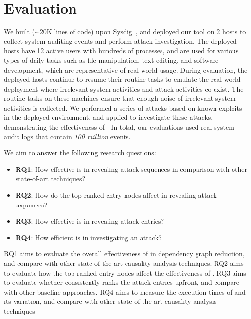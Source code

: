 \section{Evaluation}


We built \tool ($\sim$20K lines of code) upon Sysdig~\cite{sysdig}, and deployed our tool on 2 hosts to collect system auditing events and perform attack investigation. 
The deployed hosts have 12 active users with hundreds of processes, and are used for various types of daily tasks such as file manipulation, text editing, and software development, which are representative of real-world usage. 
During evaluation, the deployed hosts continue to resume their routine tasks to emulate the real-world deployment where irrelevant system activities and attack activities co-exist.
The routine tasks on these machines ensure that enough noise of irrelevant system activities is collected.
We performed a series of attacks based on known exploits~\cite{exploitdb,liu2018priotracker,kwon2018mci,reduction} in the deployed environment, and applied \tool to 
investigate these attacks, demonstrating the effectiveness of \tool.
In total, our evaluations used real system audit logs that contain \emph{100 million} events. 

We aim to answer the following research questions:

\begin{itemize}
\item \textbf{RQ1}: How effective is \tool in revealing attack sequences in comparison with other state-of-art techniques? 
\item \textbf{RQ2}: How do the top-ranked entry nodes affect \tool in revealing attack sequences?
\item \textbf{RQ3}: How effective is \tool in revealing attack entries?
\item \textbf{RQ4}: How efficient is \tool in investigating an attack?
\end{itemize}

RQ1 aims to evaluate the overall effectiveness of \tool in dependency graph reduction, and compare \tool with other state-of-the-art causality analysis techniques.
RQ2 aims to evaluate how the top-ranked entry nodes affect the effectiveness of \tool.
RQ3 aims to evaluate whether \tool consistently ranks the attack entries 
upfront, and compare \tool with other baseline approaches.
RQ4 aims to measure the execution times of \tool and its variation, and compare \tool with other state-of-the-art causality analysis techniques.

